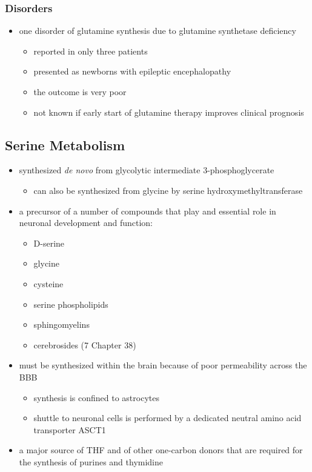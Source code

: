 \documentclass{scrartcl}
\begin{document}
\subsubsection{Disorders}
\label{sec:org93dac8c}
\begin{itemize}
\item one disorder of glutamine synthesis due to glutamine synthetase deficiency
\begin{itemize}
\item reported in only three patients
\item presented as newborns with epileptic encephalopathy
\item the outcome is very poor
\item not known if early start of glutamine therapy improves clinical
prognosis
\end{itemize}
\end{itemize}
\subsection{Serine Metabolism}
\label{sec:org961e287}
\begin{itemize}
\item synthesized \emph{de novo} from glycolytic intermediate
3-phosphoglycerate
\begin{itemize}
\item can also be synthesized from glycine by serine
hydroxymethyltransferase
\end{itemize}
\item a precursor of a number of compounds that play and essential role in
neuronal development and function:
\begin{itemize}
\item D-serine
\item glycine
\item cysteine
\item serine phospholipids
\item sphingomyelins
\item cerebrosides (7 Chapter 38)
\end{itemize}
\item must be synthesized within the brain because of poor permeability
across the BBB
\begin{itemize}
\item synthesis is confined to astrocytes
\item shuttle to neuronal cells is performed by a dedicated neutral amino
acid transporter ASCT1
\end{itemize}
\item a major source of THF and of other one-carbon donors that are
required for the synthesis of purines and thymidine
\end{itemize}
\end{document}
